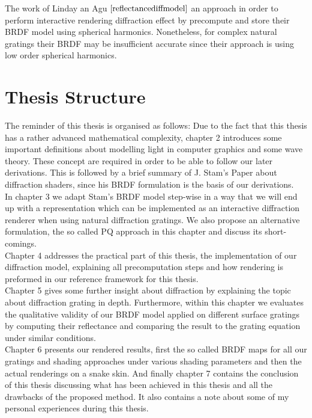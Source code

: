 The work of Linday an Agu $\cite{reflectancediffmodel}$ an approach in order to perform interactive rendering diffraction effect by precompute and store their BRDF model using spherical harmonics. Nonetheless, for complex natural gratings their BRDF may be insufficient accurate since their approach is using low order spherical harmonics.

\section{Thesis Structure}
The reminder of this thesis is organised as follows: Due to the fact that this thesis has a rather advanced mathematical complexity, chapter 2 introduces some important definitions about modelling light in computer graphics and some wave theory. These concept are required in order to be able to follow our later derivations. This is followed by a brief summary of J. Stam's Paper about diffraction shaders, since his BRDF formulation is the basis of our derivations. \\

In chapter 3 we adapt Stam's BRDF model step-wise in a way that we will end up with a representation which can be implemented as an interactive diffraction renderer when using natural diffraction gratings. We also propose an alternative formulation, the so called PQ approach in this chapter and discuss its short-comings. \\

Chapter 4 addresses the practical part of this thesis, the implementation of our diffraction model, explaining all precomputation steps and how rendering is preformed in our reference framework for this thesis. \\

Chapter 5 gives some further insight about diffraction by explaining the topic about diffraction grating in depth. Furthermore, within this chapter we evaluates the qualitative validity of our BRDF model applied on different surface gratings by computing their reflectance and comparing the result to the grating equation under similar conditions. \\

Chapter 6 presents our rendered results, first the so called BRDF maps for all our gratings and shading approaches under various shading parameters and then the actual renderings on a snake skin. And finally chapter 7 contains the conclusion of this thesis discussing what has been achieved in this thesis and all the drawbacks of the proposed method. It also contains a note about some of my personal experiences during this thesis.

